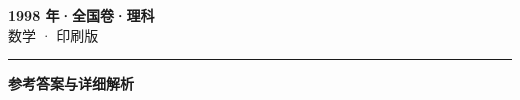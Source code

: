 \documentclass[zihao=5, a4paper]{ctexart}
\begin{document}
\begin{center}
  {\Large\bfseries 1998 年·全国卷·理科}\\[4pt]
  {\large 数学 · 印刷版}
\end{center}
\medskip
{}

\par\bigskip\hrule\bigskip
{}
\begin{center}{\large\bfseries 参考答案与详细解析}\end{center}
\smallskip

\end{document}
